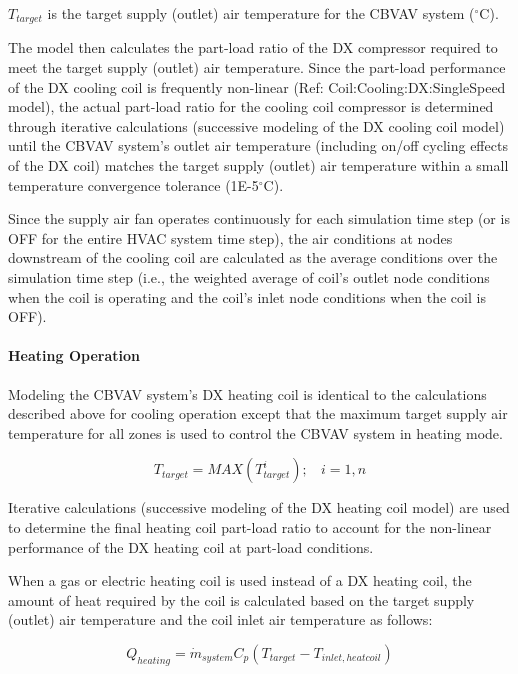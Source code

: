 \(T_{target}^{}\) is the target supply (outlet) air temperature for the CBVAV system (\(^{\circ}\)C).

The model then calculates the part-load ratio of the DX compressor required to meet the target supply (outlet) air temperature. Since the part-load performance of the DX cooling coil is frequently non-linear (Ref: Coil:Cooling:DX:SingleSpeed model), the actual part-load ratio for the cooling coil compressor is determined through iterative calculations (successive modeling of the DX cooling coil model) until the CBVAV system's outlet air temperature (including on/off cycling effects of the DX coil) matches the target supply (outlet) air temperature within a small temperature convergence tolerance (1E-5\(^{\circ}\)C).

Since the supply air fan operates continuously for each simulation time step (or is OFF for the entire HVAC system time step), the air conditions at nodes downstream of the cooling coil are calculated as the average conditions over the simulation time step (i.e., the weighted average of coil's outlet node conditions when the coil is operating and the coil's inlet node conditions when the coil is OFF).

\paragraph{Heating Operation}\label{heating-operation}

Modeling the CBVAV system's DX heating coil is identical to the calculations described above for cooling operation except that the maximum target supply air temperature for all zones is used to control the CBVAV system in heating mode.

\begin{equation}
{T_{target}} = MAX\left( {T_{target}^i} \right);~~~~i = 1,n
\end{equation}

Iterative calculations (successive modeling of the DX heating coil model) are used to determine the final heating coil part-load ratio to account for the non-linear performance of the DX heating coil at part-load conditions.

When a gas or electric heating coil is used instead of a DX heating coil, the amount of heat required by the coil is calculated based on the target supply (outlet) air temperature and the coil inlet air temperature as follows:

\begin{equation}
{Q_{heating}} = {\dot m_{system}}{C_p}({T_{target}} - {T_{inlet,heatcoil}})
\end{equation}

